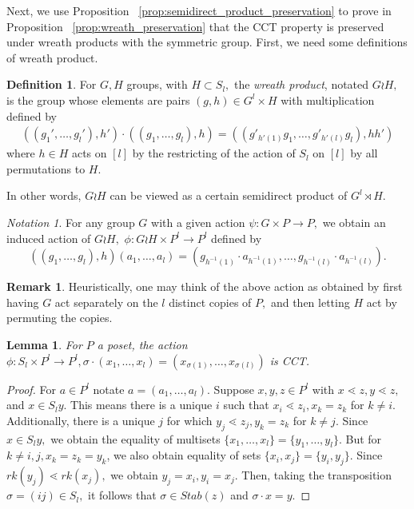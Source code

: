 \documentclass[10 pt]{amsart}
\theoremstyle{plain}
\newtheorem{lem}[thm]{Lemma}
\theoremstyle{definition}
\newtheorem{defn}[thm]{Definition}
\newtheorem{rem}[thm]{Remark}
\theoremstyle{remark}
\newtheorem{note}[thm]{Notation}
\numberwithin{equation}{section}
\begin{document}
Next, we use Proposition ~\ref{prop:semidirect_product_preservation} to prove in Proposition ~\ref{prop:wreath_preservation} that the CCT property is preserved under wreath products with the symmetric group. First, we need some definitions of wreath product.

\begin{defn}
For $G, H$ groups, with $H \subset S_l,$ the {\it wreath product}, notated $G \wr H,$ is the group whose elements are pairs $(g,h) \in G^l\times H$ with multiplication defined by
\begin{align*}
((g_1',\ldots, g_l'),h') \cdot ((g_1,\ldots, g_l) ,h) =((g'_{h'(1)}g_1,\ldots, g'_{h'(l)}g_l),hh')
\end{align*}
where $h \in H$ acts on $[l]$ by the restricting of the action of $S_l$ on $[l]$ by all permutations to $H.$
\end{defn}

In other words, $G\wr H$ can be viewed as a certain semidirect product of $G^l \rtimes H.$

\begin{note}
\label{note:wreath_action}
For any group $G$ with a given action $\psi:G\times P \rightarrow P,$ we obtain an induced action of $G \wr H,$ $\phi:G \wr H \times P^l \rightarrow P^l$ defined by 
$$((g_1,\ldots, g_l),h)(a_1,\ldots, a_l) = (g_{h^{-1}(1)}\cdot a_{h^{-1}(1)},\ldots,g_{h^{-1}(l)} \cdot a_{h^{-1}(l)}).$$
\end{note}

\begin{rem}
Heuristically, one may think of the above action as obtained by first having $G$ act separately on the $l$ distinct copies of $P,$ and then letting $H$ act by permuting the copies.
\end{rem}

\begin{lem}
\label{lem:symmetric_group_product_action}
For $P$ a poset, the action $\phi:S_l \times P^l \rightarrow P^l,\sigma \cdot(x_1,\ldots, x_l) = (x_{\sigma(1)},\ldots, x_{\sigma(l)})$ is CCT.
\end{lem}
\begin{proof}
For $a \in P^l$ notate $a = (a_1,\ldots, a_l).$ Suppose $x,y,z \in P^l$ with $x\lessdot z,y\lessdot z,$ and $x \in S_ly.$ This means there is a unique $i$ such that $x_i \lessdot z_i,x_k = z_k$ for $k \neq i.$ Additionally, there is a unique $j$ for which $y_j \lessdot z_j,y_k =z_k$ for $k \neq j.$ Since $x \in S_ly,$ we obtain the equality of multisets $\{x_1,\ldots, x_l\}=\{y_1,\ldots,y_l\}.$ But for $k \neq i,j,x_k = z_k = y_k$, we also obtain equality of sets $\{x_i,x_j\} = \{y_i,y_j\}.$ Since $rk(y_j) \lessdot rk(x_j),$ we obtain $y_j = x_i,y_i = x_j.$ Then, taking the transposition $\sigma  = (ij) \in S_l,$ it follows that $\sigma \in Stab(z)$ and $\sigma \cdot x = y.$
\end{proof}
\end{document}
